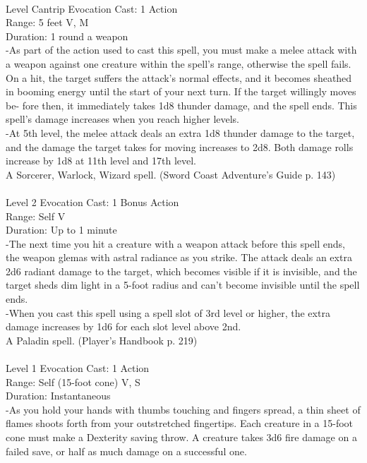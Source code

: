 \documentclass[10pt,twocolumn]{report}
\begin{document}
 \\
Level Cantrip \quad Evocation \quad Cast: 1 Action\\
Range: 5 feet \quad V, M\\
Duration: 1 round \quad a weapon\\
-As part of the action used to cast this spell, you must make a melee attack with a weapon against one creature within the spell's range, otherwise the spell fails.
On a hit, the target suffers the attack's normal effects, and it becomes sheathed in booming energy until the start of your next turn. If the target willingly moves be- fore then, it immediately takes 1d8 thunder damage, and the spell ends.
This spell's damage increases when you reach higher levels.\\
-At 5th level, the melee attack deals an extra 1d8 thunder damage to the target, and the damage the target takes for moving increases to 2d8. Both damage rolls increase by 1d8 at 11th level and 17th level.\\
A Sorcerer, Warlock, Wizard spell. (Sword Coast Adventure's Guide p. 143) \\


 \\
Level 2 \quad Evocation \quad Cast: 1 Bonus Action\\
Range: Self \quad V\\
Duration: Up to 1 minute \quad \\
-The next time you hit a creature with a weapon attack before this spell ends, the weapon glemas with astral radiance as you strike. The attack deals an extra 2d6 radiant damage to the target, which becomes visible if it is invisible, and the target sheds dim light in a 5-foot radius and can’t become invisible until the spell ends.\\
-When you cast this spell using a spell slot of 3rd level or higher, the extra damage increases by 1d6 for each slot level above 2nd.\\
A Paladin spell. (Player's Handbook p. 219) \\


 \\
Level 1 \quad Evocation \quad Cast: 1 Action\\
Range: Self (15-foot cone) \quad V, S\\
Duration: Instantaneous \quad \\
-As you hold your hands with thumbs touching and fingers spread, a thin sheet of flames shoots forth from your outstretched fingertips. Each creature in a 15-foot cone must make a Dexterity saving throw. A creature takes 3d6 fire damage on a failed save, or half as much damage on a successful one. 
\end{document}

